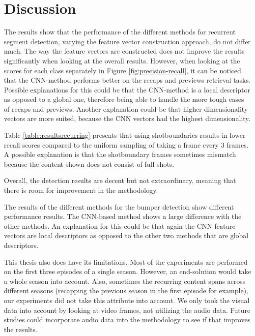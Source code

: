 \documentclass{report}
\begin{document}
\section{Discussion} \label{discussion}
The results show that the performance of the different methods for recurrent segment detection, varying the feature vector construction approach, do not differ much. The way the feature vectors are constructed does not improve the results significantly when looking at the overall results. However, when looking at the scores for each class separately in Figure \ref{fig:precision-recall}, it can be noticed that the CNN-method performs better on the recaps and previews retrieval tasks. Possible explanations for this could be that the CNN-method is a local descriptor as opposed to a global one, therefore being able to handle the more tough cases of recaps and previews. Another explanation could be that higher dimensionality vectors are more suited, because the CNN vectors had the highest dimensionality.

Table \ref{table:resultsrecurring} presents that using shotboundaries results in lower recall scores compared to the uniform sampling of taking a frame every 3 frames. A possible explanation is that the shotboundary frames sometimes mismatch because the content shown does not consist of full shots.

Overall, the detection results are decent but not extraordinary, meaning that there is room for improvement in the methodology. 

The results of the different methods for the bumper detection show different performance results. The CNN-based method shows a large difference with the other methods. An explanation for this could be that again the CNN feature vectors are local descriptors as opposed to the other two methods that are global descriptors.

This thesis also does have its limitations. Most of the experiments are performed on the first three episodes of a single season. However, an end-solution would take a whole season into account. Also, sometimes the recurring content spans across different seasons (recapping the previous season in the first episode for example), our experiments did not take this attribute into account. We only took the visual data into account by looking at video frames, not utilizing the audio data. Future studies could incorporate audio data into the methodology to see if that improves the results.
\end{document}

